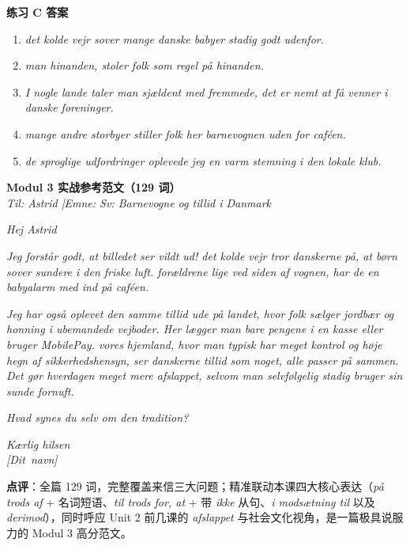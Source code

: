 \begin{answerbox}
\textbf{练习 C 答案}
\begin{enumerate}
  \item \textit{ det kolde vejr sover mange danske babyer stadig godt udenfor.}
  \item \textit{ man  hinanden, stoler folk som regel på hinanden.}
  \item \textit{I nogle lande taler man sjældent med fremmede,  det  er nemt at få venner i danske foreninger.}
  \item \textit{ mange andre storbyer stiller folk her barnevognen uden for caféen.}
  \item \textit{ de sproglige udfordringer oplevede jeg en varm stemning i den lokale klub.}
\end{enumerate}

\textbf{Modul 3 实战参考范文（129 词）}\\
\textit{Til: Astrid \quad|\quad Emne: Sv: Barnevogne og tillid i Danmark}

\textit{Hej Astrid}

\textit{Jeg forstår godt, at billedet ser vildt ud!  det kolde vejr tror danskerne på, at børn sover sundere i den friske luft.  forældrene  lige ved siden af vognen, har de en babyalarm med ind på caféen.}

\textit{Jeg har også oplevet den samme tillid ude på landet, hvor folk sælger jordbær og honning i ubemandede vejboder. Her lægger man bare pengene i en kasse eller bruger MobilePay.  vores hjemland, hvor man typisk har meget kontrol og høje hegn af sikkerhedshensyn, ser danskerne  tillid som noget, alle passer på sammen. Det gør hverdagen meget mere afslappet, selvom man selvfølgelig stadig bruger sin sunde fornuft.}

\textit{Hvad synes du selv om den tradition?}

\textit{Kærlig hilsen\\
\mbox{[Dit navn]}}

\small\textbf{点评}：全篇 129 词，完整覆盖来信三大问题；精准联动本课四大核心表达（\textit{på trods af} + 名词短语、\textit{til trods for, at} + 带 \textit{ikke} 从句、\textit{i modsætning til} 以及 \textit{derimod}），同时呼应 Unit 2 前几课的 \textit{afslappet} 与社会文化视角，是一篇极具说服力的 Modul 3 高分范文。
\end{answerbox}
